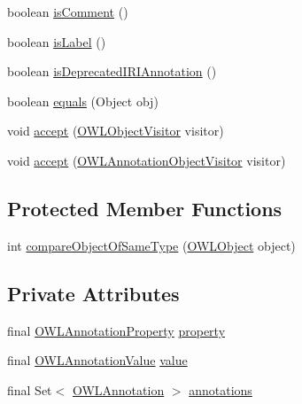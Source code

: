 \begin{DoxyCompactItemize}
boolean \hyperlink{classuk_1_1ac_1_1manchester_1_1cs_1_1owl_1_1owlapi_1_1_o_w_l_annotation_impl_a32685b40ce57d1eca80bc72ea37ed9e3}{is\-Comment} ()
\item 
boolean \hyperlink{classuk_1_1ac_1_1manchester_1_1cs_1_1owl_1_1owlapi_1_1_o_w_l_annotation_impl_a447d5b05836f3c9ac9b9f312194a96e5}{is\-Label} ()
\item 
boolean \hyperlink{classuk_1_1ac_1_1manchester_1_1cs_1_1owl_1_1owlapi_1_1_o_w_l_annotation_impl_ac72dc7fe87110f8016b88a88f6e1d3ea}{is\-Deprecated\-I\-R\-I\-Annotation} ()
\item 
boolean \hyperlink{classuk_1_1ac_1_1manchester_1_1cs_1_1owl_1_1owlapi_1_1_o_w_l_annotation_impl_adbf6c8b2d022f490cb8c6d3c8d61013b}{equals} (Object obj)
\item 
void \hyperlink{classuk_1_1ac_1_1manchester_1_1cs_1_1owl_1_1owlapi_1_1_o_w_l_annotation_impl_aa9c436718a0d802dd82602cb13f7d78f}{accept} (\hyperlink{interfaceorg_1_1semanticweb_1_1owlapi_1_1model_1_1_o_w_l_object_visitor}{O\-W\-L\-Object\-Visitor} visitor)
\item 
void \hyperlink{classuk_1_1ac_1_1manchester_1_1cs_1_1owl_1_1owlapi_1_1_o_w_l_annotation_impl_aa67c0e70d31f356e6ccccfe11e3f1f2c}{accept} (\hyperlink{interfaceorg_1_1semanticweb_1_1owlapi_1_1model_1_1_o_w_l_annotation_object_visitor}{O\-W\-L\-Annotation\-Object\-Visitor} visitor)
\end{DoxyCompactItemize}
\subsection*{Protected Member Functions}
\begin{DoxyCompactItemize}
\item 
int \hyperlink{classuk_1_1ac_1_1manchester_1_1cs_1_1owl_1_1owlapi_1_1_o_w_l_annotation_impl_a2f01e039e8dc261f70dfed1734f64c16}{compare\-Object\-Of\-Same\-Type} (\hyperlink{interfaceorg_1_1semanticweb_1_1owlapi_1_1model_1_1_o_w_l_object}{O\-W\-L\-Object} object)
\end{DoxyCompactItemize}
\subsection*{Private Attributes}
\begin{DoxyCompactItemize}
\item 
final \hyperlink{interfaceorg_1_1semanticweb_1_1owlapi_1_1model_1_1_o_w_l_annotation_property}{O\-W\-L\-Annotation\-Property} \hyperlink{classuk_1_1ac_1_1manchester_1_1cs_1_1owl_1_1owlapi_1_1_o_w_l_annotation_impl_ab61ebf1f881235ea4f922b75afc5419f}{property}
\item 
final \hyperlink{interfaceorg_1_1semanticweb_1_1owlapi_1_1model_1_1_o_w_l_annotation_value}{O\-W\-L\-Annotation\-Value} \hyperlink{classuk_1_1ac_1_1manchester_1_1cs_1_1owl_1_1owlapi_1_1_o_w_l_annotation_impl_af4f4797d8db2e3b4b2112d798cf563ae}{value}
\item 
final Set$<$ \hyperlink{interfaceorg_1_1semanticweb_1_1owlapi_1_1model_1_1_o_w_l_annotation}{O\-W\-L\-Annotation} $>$ \hyperlink{classuk_1_1ac_1_1manchester_1_1cs_1_1owl_1_1owlapi_1_1_o_w_l_annotation_impl_a097eeb1c93d1e69b51adf9e986695f28}{annotations}
\end{DoxyCompactItemize}
